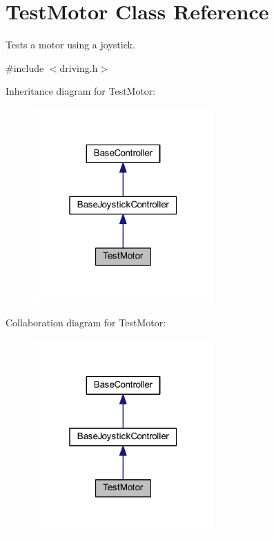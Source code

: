 \hypertarget{class_test_motor}{\section{\-Test\-Motor \-Class \-Reference}
\label{class_test_motor}
}


\-Tests a motor using a joystick.  




{\ttfamily \#include $<$driving.\-h$>$}



\-Inheritance diagram for \-Test\-Motor\-:\nopagebreak
\begin{figure}[H]
\begin{center}
\leavevmode
\includegraphics[width=196pt]{class_test_motor__inherit__graph}
\end{center}
\end{figure}


\-Collaboration diagram for \-Test\-Motor\-:\nopagebreak
\begin{figure}[H]
\begin{center}
\leavevmode
\includegraphics[width=196pt]{class_test_motor__coll__graph}
\end{center}
\end{figure}
